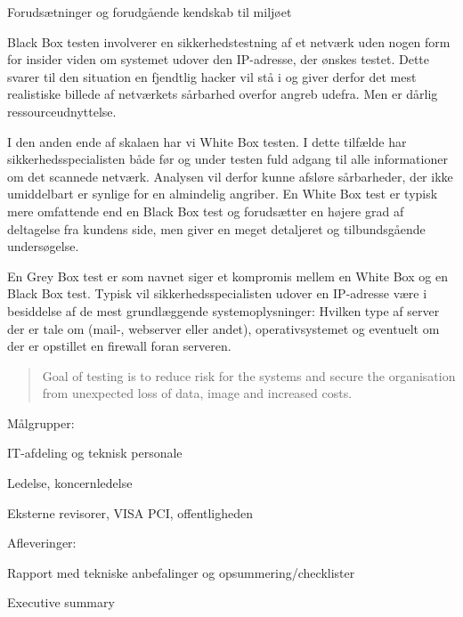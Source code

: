 \documentclass[Screen16to9,17pt]{foils}
\begin{document}


\begin{list2}
\item Forudsætninger og forudgående kendskab til miljøet
\item Black Box testen involverer en sikkerhedstestning af et netværk uden
nogen form for insider viden om systemet udover den IP-adresse, der
ønskes testet. Dette svarer til den situation en fjendtlig hacker vil
stå i og giver derfor det mest realistiske billede af netværkets
sårbarhed overfor angreb udefra. Men er dårlig ressourceudnyttelse.
\item I den anden ende  af skalaen har vi White Box testen. I dette tilfælde
har sikkerhedsspecialisten både før og under testen fuld adgang til
alle informationer om det scannede netværk. Analysen vil derfor kunne
afsløre sårbarheder, der ikke umiddelbart er synlige for en almindelig
angriber. En White Box test er typisk mere omfattende end en Black Box
test og forudsætter en højere grad af deltagelse fra kundens side, men
giver en meget detaljeret og tilbundsgående undersøgelse.

\item En Grey Box test er som navnet siger et kompromis mellem en White Box
og en Black Box test. Typisk vil sikkerhedsspecialisten udover en
IP-adresse være i besiddelse af de mest grundlæggende
systemoplysninger: Hvilken type af server der er tale om (mail-,
webserver eller andet), operativsystemet og eventuelt om der er
opstillet en firewall foran serveren.
\end{list2}



\begin{quote}
Goal of testing is to reduce risk for the systems and secure the organisation\\ from unexpected loss of data, image and increased costs.
\end{quote}

\begin{list1}
\item Målgrupper:
\begin{list2}
\item IT-afdeling og teknisk personale
\item Ledelse, koncernledelse
\item Eksterne revisorer, VISA PCI, offentligheden
\end{list2}
\item Afleveringer:
\begin{list2}
\item Rapport med tekniske anbefalinger og opsummering/checklister
\item Executive summary
\end{list2}
\end{list1}
\end{document}
